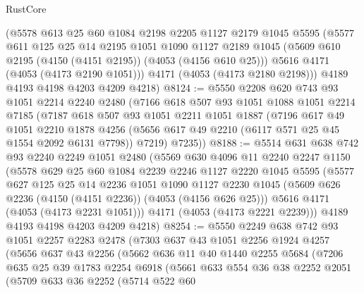 \begin{lexlean}{RustCore}
\begin{coremodule}
      (@5578
        @613
        @25
        @60
        @1084
        @2198
        @2205
        @1127
        @2179
        @1045
        @5595
        (@5577
          @611
          @125
          @25
          @14
          @2195
          @1051
          @1090
          @1127
          @2189
          @1045
          (@5609 @610 @2195 (@4150 (@4151 @2195)) (@4053 (@4156 @610 @25)))
          @5616
          @4171
          (@4053 (@4173 @2190 @1051)))
        @4171
        (@4053 (@4173 @2180 @2198)))
      @4189
      @4193
      @4198
      @4203
      @4209
      @4218)
@8124 := @5550
    @2208
    @620
    @743
    @93
    @1051
    @2214
    @2240
    @2480
    (@7166
      @618
      @507
      @93
      @1051
      @1088
      @1051
      @2214
      @7185
      (@7187
        @618
        @507
        @93
        @1051
        @2211
        @1051
        @1887
        (@7196
          @617
          @49
          @1051
          @2210
          @1878
          @4256
          (@5656 @617 @49 @2210 (@6117 @571 @25 @45 @1554 @2092 @6131 @7798))
          @7219)
        @7235))
@8188 := @5514
    @631
    @638
    @742
    @93
    @2240
    @2249
    @1051
    @2480
    (@5569
      @630
      @4096
      @11
      @2240
      @2247
      @1150
      (@5578
        @629
        @25
        @60
        @1084
        @2239
        @2246
        @1127
        @2220
        @1045
        @5595
        (@5577
          @627
          @125
          @25
          @14
          @2236
          @1051
          @1090
          @1127
          @2230
          @1045
          (@5609 @626 @2236 (@4150 (@4151 @2236)) (@4053 (@4156 @626 @25)))
          @5616
          @4171
          (@4053 (@4173 @2231 @1051)))
        @4171
        (@4053 (@4173 @2221 @2239)))
      @4189
      @4193
      @4198
      @4203
      @4209
      @4218)
@8254 := @5550
    @2249
    @638
    @742
    @93
    @1051
    @2257
    @2283
    @2478
    (@7303
      @637
      @43
      @1051
      @2256
      @1924
      @4257
      (@5656
        @637
        @43
        @2256
        (@5662
          @636
          @11
          @40
          @1440
          @2255
          @5684
          (@7206
            @635
            @25
            @39
            @1783
            @2254
            @6918
            (@5661
              @633
              @554
              @36
              @38
              @2252
              @2051
              (@5709
                @633
                @36
                @2252
                (@5714
                  @522
                  @60

\end{coremodule}
\end{lexlean}
